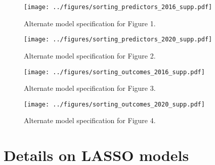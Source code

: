 \documentclass[10pt,landscape]{article}
\begin{document}
\clearpage
\begin{figure}[h]
    \centering
    \texttt{[image: ../figures/sorting\_predictors\_2016\_supp.pdf]}
    \caption{Alternate model specification for Figure 1.}
    \label{fig:sorting_predictors_2016_supp}
\end{figure}

\begin{figure}[h]
    \centering
    \texttt{[image: ../figures/sorting\_predictors\_2020\_supp.pdf]}
    \caption{Alternate model specification for Figure 2.}
    \label{fig:sorting_predictors_2020_supp}
\end{figure}

\begin{figure}[h]
    \centering
    \texttt{[image: ../figures/sorting\_outcomes\_2016\_supp.pdf]}
    \caption{Alternate model specification for Figure 3.}
    \label{fig:sorting_outcomes_2016_supp}
\end{figure}

\begin{figure}[h]
    \centering
    \texttt{[image: ../figures/sorting\_outcomes\_2020\_supp.pdf]}
    \caption{Alternate model specification for Figure 4.}
    \label{fig:sorting_outcomes_2020_supp}
\end{figure}

\clearpage

\clearpage


\clearpage


\clearpage

\clearpage

\clearpage

\clearpage


\clearpage

\clearpage

\clearpage

\clearpage

\section{Details on LASSO models}
\end{document}
